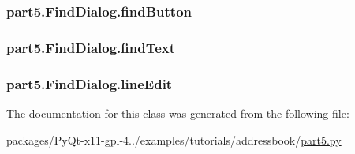 \subsubsection[{find\+Button}]{\setlength{\rightskip}{0pt plus 5cm}part5.\+Find\+Dialog.\+find\+Button}\label{classpart5_1_1FindDialog_abc880dac16b9afe22277eb0f257e3e77}
\hypertarget{classpart5_1_1FindDialog_a9206a97ae0d6e691943e70d69b86253a}{}
\subsubsection[{find\+Text}]{\setlength{\rightskip}{0pt plus 5cm}part5.\+Find\+Dialog.\+find\+Text}\label{classpart5_1_1FindDialog_a9206a97ae0d6e691943e70d69b86253a}
\hypertarget{classpart5_1_1FindDialog_a4ded623193cbdfd952055d4094e38304}{}
\subsubsection[{line\+Edit}]{\setlength{\rightskip}{0pt plus 5cm}part5.\+Find\+Dialog.\+line\+Edit}\label{classpart5_1_1FindDialog_a4ded623193cbdfd952055d4094e38304}


The documentation for this class was generated from the following file\+:\begin{DoxyCompactItemize}
\item 
packages/\+Py\+Qt-\/x11-\/gpl-\/4../examples/tutorials/addressbook/\hyperlink{part5_8py}{part5.\+py}\end{DoxyCompactItemize}

